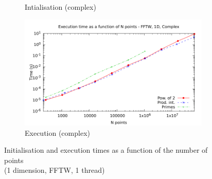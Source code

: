 \documentclass[12pt, a4paper]{article}
\begin{document}
\begin{figure}[H]
\begin{subfigure}{.5\textwidth}
\caption{Intialisation (complex)}
\label{1DFFTWCI}
\end{subfigure}%
\begin{subfigure}{.5\textwidth}
\centering
\includegraphics[width=.9\linewidth]{graphs/1d-fftw-exec-c.pdf}
\caption{Execution (complex)}
\label{1DFFTWC}
\end{subfigure}
\caption{Initialisation and execution times as a function of the number of points\\(1 dimension, FFTW, 1 thread)}
\label{1DFFTW}
\end{figure}
\end{document}
